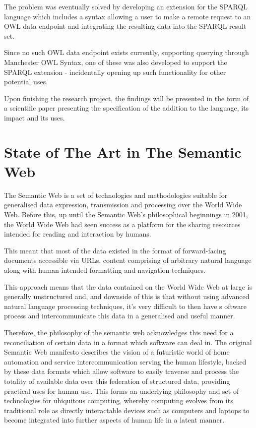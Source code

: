 \documentclass{article}
\begin{document}
The problem was eventually solved by developing an extension for the SPARQL
language which includes a syntax allowing a user to make a remote request to an
OWL data endpoint and integrating the resulting data into the SPARQL result set. 

Since no such OWL data endpoint exists currently, supporting querying through
Manchester OWL Syntax, one of these was also developed to support the SPARQL
extension - incidentally opening up such functionality for other potential uses.

Upon finishing the research project, the findings will be presented in the form
of a scientific paper presenting the specification of the addition to the
language, its impact and its uses.

\section{State of The Art in The Semantic Web}

The Semantic Web is a set of technologies and methodologies suitable for
generalised data expression, transmission and processing over the World Wide
Web. Before this, up until the Semantic Web's philosophical beginnings in
2001, the World Wide Web had seen success as a platform for the
sharing resources intended for reading and interaction by humans.

This meant that most of the data existed in the format of forward-facing 
documents accessible via URLs, content comprising of arbitrary natural language
along with human-intended formatting and navigation techniques.

This approach means that the data contained on the World Wide Web at large is
generally unstructured and, and downside of this is that without using advanced 
natural language  processing techniques, it's very difficult to then have s
oftware process and intercommunicate this data in a generalised and useful manner.

Therefore, the philosophy of the semantic web acknowledges this need for a
reconciliation of certain data in a format which software can deal in. The
original Semantic Web manifesto\cite{semweb} describes the vision of a 
futuristic world of home automation and service intercommunication serving 
the human lifestyle, backed by these data formats which allow software to 
easily traverse and process the totality of available data over this federation
of structured data, providing practical uses for human use. This forms an
underlying philosophy and set of technologies for ubiquitous computing,
whereby computing evolves from its traditional role as directly interactable
devices such as computers and laptops to become integrated into further
aspects of human life in a latent manner.
\end{document}
